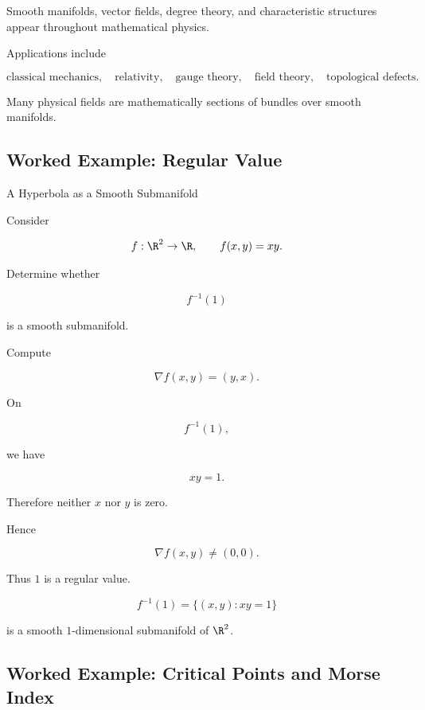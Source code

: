 Smooth manifolds, vector fields, degree theory, and characteristic
structures appear throughout mathematical physics.

Applications include

\[
\boxed{
\text{classical mechanics},
\quad
\text{relativity},
\quad
\text{gauge theory},
\quad
\text{field theory},
\quad
\text{topological defects}.
}
\]

Many physical fields are mathematically sections of bundles over smooth
manifolds.

\subsection{Worked Example: Regular Value}
\label{subsec:worked-regular-value}

\begin{workedexamplebox}{A Hyperbola as a Smooth Submanifold}

Consider

\[
f:\R^2\to\R,
\qquad
f(x,y)=xy.
\]

Determine whether

\[
f^{-1}(1)
\]

is a smooth submanifold.

Compute

\[
\nabla f(x,y)
=
(y,x).
\]

On

\[
f^{-1}(1),
\]

we have

\[
xy=1.
\]

Therefore neither \(x\) nor \(y\) is zero.

Hence

\[
\nabla f(x,y)\neq(0,0).
\]

Thus \(1\) is a regular value.

\begin{answerbox}
\[
\boxed{
f^{-1}(1)
=
\{(x,y):xy=1\}
}
\]

is a smooth \(1\)-dimensional submanifold of \(\R^2\).
\end{answerbox}
\end{workedexamplebox}

\subsection{Worked Example: Critical Points and Morse Index}
\label{subsec:worked-morse-index}

